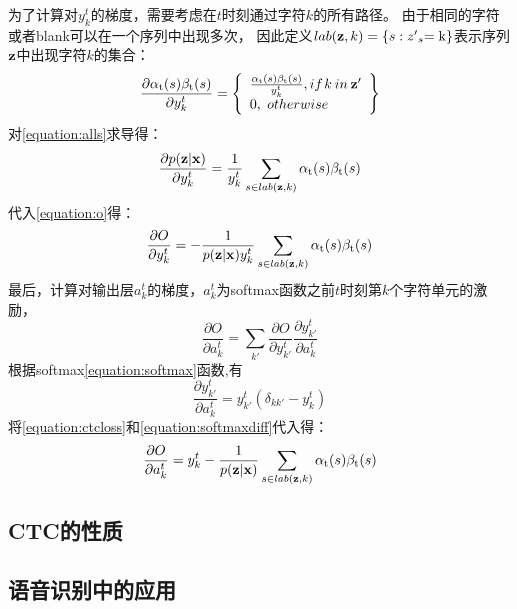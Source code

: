 为了计算对$y_k^t$的梯度，需要考虑在$t$时刻通过字符$k$的所有路径。
由于相同的字符或者blank可以在一个序列中出现多次，
因此定义$lab({\bf{z}},k) = \{ s:{{z'}_s}{\rm{ = k\} }}$表示序列$\bf{z}$中出现字符$k$的集合：
\begin{equation}
\frac{{\partial {\alpha _{\rm{t}}}(s){\beta _{\rm{t}}}(s)}}{{\partial y_k^t}} = \left\{ \begin{array}{l}
\frac{{{\alpha _{\rm{t}}}(s){\beta _{\rm{t}}}(s)}}{{y_k^t}},if{\kern 1pt} k{\kern 1pt} {\kern 1pt} in{\kern 1pt} {\kern 1pt} {\bf{z'}}\\
0,{\kern 1pt} {\kern 1pt} {\kern 1pt} otherwise
\end{array} \right\}
\end{equation}
对\ref{equation:alls}求导得：
\begin{equation}
\frac{{\partial p({\bf{z}}|{\bf{x}})}}{{\partial y_k^t}} = \frac{1}{{y_k^t}}\sum\limits_{s \in lab({\bf{z}},k)}^{} {{\alpha _{\rm{t}}}(s){\beta _{\rm{t}}}(s)}
\end{equation}
代入\ref{equation:o}得：
\begin{equation}
\label{equation:ctcloss}
\frac{{\partial O}}{{\partial y_k^t}} =  - \frac{1}{{p({\bf{z}}|{\bf{x}})y_k^t}}\sum\limits_{s \in lab({\bf{z}},k)}^{} {{\alpha _{\rm{t}}}(s){\beta _{\rm{t}}}(s)}
\end{equation}
最后，计算对输出层$a_k^t$的梯度，$a_k^t$为softmax函数之前$t$时刻第$k$个字符单元的激励，
\begin{equation}
\label{equation:alldiff}
\frac{{\partial O}}{{\partial a_k^t}} = \sum\limits_{k'} {\frac{{\partial O}}{{\partial y_{k'}^t}}} \frac{{\partial y_{k'}^t}}{{\partial a_k^t}}
\end{equation}
根据softmax\ref{equation:softmax}函数,有
\begin{equation}
\label{equation:softmaxdiff}
\frac{{\partial y_{k'}^t}}{{\partial a_k^t}} = y_{k'}^t({\delta _{kk'}} - y_k^t)
\end{equation}
将\ref{equation:ctcloss}和\ref{equation:softmaxdiff}代入\label{equation:alldiff}得：
\begin{equation}
\frac{{\partial O}}{{\partial a_k^t}} = y_k^t - \frac{1}{{p({\bf{z}}|{\bf{x}})}}\sum\limits_{s \in lab({\bf{z}},k)}^{} {{\alpha _{\rm{t}}}(s){\beta _{\rm{t}}}(s)}
\end{equation}

\subsection{CTC的性质}


\subsection{语音识别中的应用}